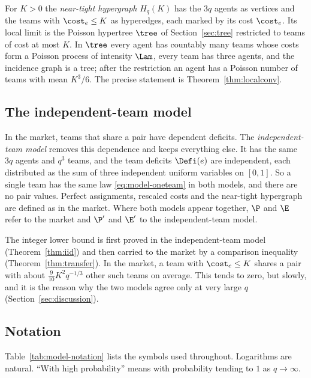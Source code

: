 For $K>0$ the \emph{near-tight hypergraph} $H_q(K)$ has the $3q$ agents as vertices and the
teams with $\cost_e\le K$ as hyperedges, each marked by its cost $\cost_e$. Its local limit is
the Poisson hypertree $\tree$ of Section~\ref{sec:tree} restricted to teams of cost at most
$K$. In $\tree$ every agent has countably many teams whose costs form a Poisson process of
intensity $\Lam$, every team has three agents, and the incidence graph is a tree; after the
restriction an agent has a Poisson number of teams with mean $K^3/6$. The precise statement
is Theorem~\ref{thm:localconv}.

\subsection{The independent-team model}\label{sec:model-iid}

In the market, teams that share a pair have dependent deficits. The \emph{independent-team
model} removes this dependence and keeps everything else. It has the same $3q$ agents and
$q^3$ teams, and the team deficits $\Defi(e)$ are independent, each distributed as the sum of
three independent uniform variables on $[0,1]$. So a single team has the same law
\eqref{eq:model-oneteam} in both models, and there are no pair values. Perfect assignments,
rescaled costs and the near-tight hypergraph are defined as in the market. Where both models
appear together, $\P$ and $\E$ refer to the market and $\P'$ and $\E'$ to the independent-team
model.

The integer lower bound is first proved in the independent-team model (Theorem~\ref{thm:iid})
and then carried to the market by a comparison inequality (Theorem~\ref{thm:transfer}). In the
market, a team with $\cost_e\le K$ shares a pair with about $\tfrac{9}{10}K^2q^{-1/3}$ other
such teams on average. This tends to zero, but slowly, and it is the reason why the two models
agree only at very large $q$ (Section~\ref{sec:discussion}).

\subsection{Notation}\label{sec:model-notation}

Table~\ref{tab:model-notation} lists the symbols used throughout. Logarithms are natural.
``With high probability'' means with probability tending to $1$ as $q\to\infty$.


